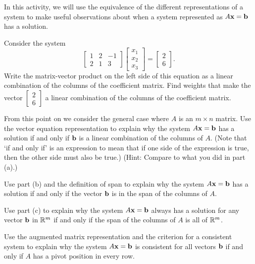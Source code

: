 \begin{activity} In this activity, we will use the equivalence of the different representations of a system to make useful observations about when a system represented as $A\mathbf{x}=\mathbf{b}$ has a solution. 

\ba
\item Consider the system
\[\left[ \begin{array}{ccr} 1&2&-1 \\ 2&1&3 \end{array} \right] \left[ \begin{array}{c} x_1 \\ x_2 \\ x_3\end{array} \right] = \left[ \begin{array}{c} 2 \\ 6 \end{array} \right].\]
Write the matrix-vector product on the left side of this equation as a linear combination of the columns of the coefficient matrix. Find weights that make the vector $\left[ \begin{array}{c} 2 \\ 6 \end{array} \right]$ a linear combination of the columns of the coefficient matrix. 

\item From this point on we consider the general case where $A$ is an $m \times n$ matrix. Use the vector equation representation to explain why the system $A \mathbf{x} = \mathbf{b}$ has a solution if and only if $\mathbf{b}$ is a linear combination of the columns of $A$. (Note that `if and only if' is an expression to mean that if one side of the expression is true, then the other side must also be true.) (Hint: Compare to what you did in part (a).)



\item Use part (b) and the definition of span to explain why the system $A \mathbf{x} = \mathbf{b}$ has a solution if and only if the vector $\mathbf{b}$ is in the span of the columns of $A$. 



\item Use part (c) to explain why the system $A \mathbf{x} = \mathbf{b}$ always has a solution for any vector $\mathbf{b}$ in $\mathbb{R}^m$ if and only if the span of the columns of $A$ is all of $\mathbb{R}^m$.



\item Use the augmented matrix representation and the criterion for a consistent system to explain why the system $A \mathbf{x} = \mathbf{b}$ is consistent for all vectors $\mathbf{b}$ if and only if $A$ has a pivot position in every row.



\ea

\end{activity}

